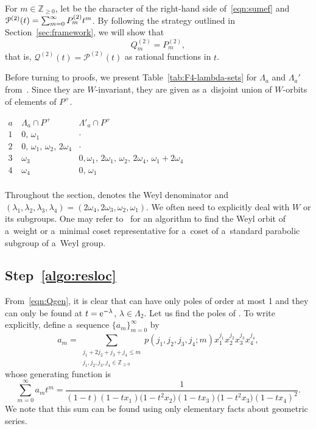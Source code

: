 \documentclass[pdftex]{sigma}
\numberwithin{equation}{section}
\theoremstyle{definition}
\newcommand{\Z}{\mathbb{Z}}
\newcommand{\Q}[2]{Q^{(#1)}_{#2}}
\newcommand{\PP}[2]{P^{(#1)}_{#2}}
\newcommand\La{\Lambda}
\newcommand\la{\lambda}
\begin{document}
For $m\in \Z_{\geq 0}$, let \smash{$\PP{2}{m}$} be the character of the right-hand side of~\eqref{eqn:sumef} and $\smash{\mathcal{P}^{(2)}(t)} = \smash{\sum_{m=0}^{\infty}\PP2m t^m}$. By following the strategy outlined in Section~\ref{sec:framework}, we will show that
\begin{equation}\label{eqn:QeqP}
\Q2m =\PP{2}{m},
\end{equation}
that is,
$
\mathcal{Q}^{(2)}(t)=\mathcal{P}^{(2)}(t)
$
as rational functions in $t$.

Before turning to proofs, we present Table~\ref{tab:F4-lambda-sets} for $\La_a$ and $\La_a'$ from~\cite{MR3948941}. Since they are $W$-invariant, they are given as a~disjoint union of $W$-orbits of elements of $P^+$.
\begin{table}[ht]\centering
$
\begin{array}{c|c|c}
 a~& \La_a\cap P^+ & \La'_a\cap P^+ \\
\hline
 1 & 0,\,\omega_1 & \cdot \\
 2 & 0,\,\omega_1,\,\omega_2,\,2 \omega_4 & \cdot \\
 3 & \omega_3 & 0,\omega_1,\,2 \omega_1,\,\omega_2,\,2 \omega_4,\,\omega_1+2 \omega_4 \\
 4 & \omega_4 & 0,\,\omega_1 \\
\end{array}
$
\caption{The sets $\La_a$ and $\La'_a$ in type $F_4$.}
\label{tab:F4-lambda-sets}
\end{table}
Throughout the section,  denotes the Weyl denominator and $(\la_1,\la_2,\la_3,\la_4)=(2\omega_4,2\omega_3,\omega_2,\omega_1)$.
We often need to explicitly deal with $W$ or its subgroups.
One may refer to~\cite{MR1073413} for an algorithm to find the Weyl orbit of a~weight or a~minimal coset representative for a~coset of a~standard parabolic subgroup of a~Weyl group.

\subsection{Step~\ref{algo:resloc}}\label{subsec:resloc}
From~\eqref{eqn:Qgen}, it is clear that  can have only poles of order at most 1 and they can only be found at $t={\rm e}^{-\la}$, $\la\in \La_2$. Let us find the poles of . To write  explicitly, define a~sequence $\{a_m\}_{m=0}^{\infty}$ by
\[
a_m=\sum_{
	\substack{
		j_1 + 2 j_2 + j_3 + j_4 \le m\\
		j_1,j_2,j_3,j_4 \in \Z_{\geq 0}
	}
	}
p(j_1,j_2,j_3,j_4;m) x_1^{j_1}x_2^{j_2}x_3^{j_3}x_4^{j_4},
\]
whose generating function is
\[
\sum_{m=0}^{\infty}a_mt^m=\frac{1}{(1-t) (1-t x_1) \bigl(1-t^2 x_2\bigr) (1-t x_3) \bigl(1-t^2 x_3\bigr) (1-t x_4)^2}.
\]
We note that this sum can be found using only elementary facts about geometric series.
\end{document}
